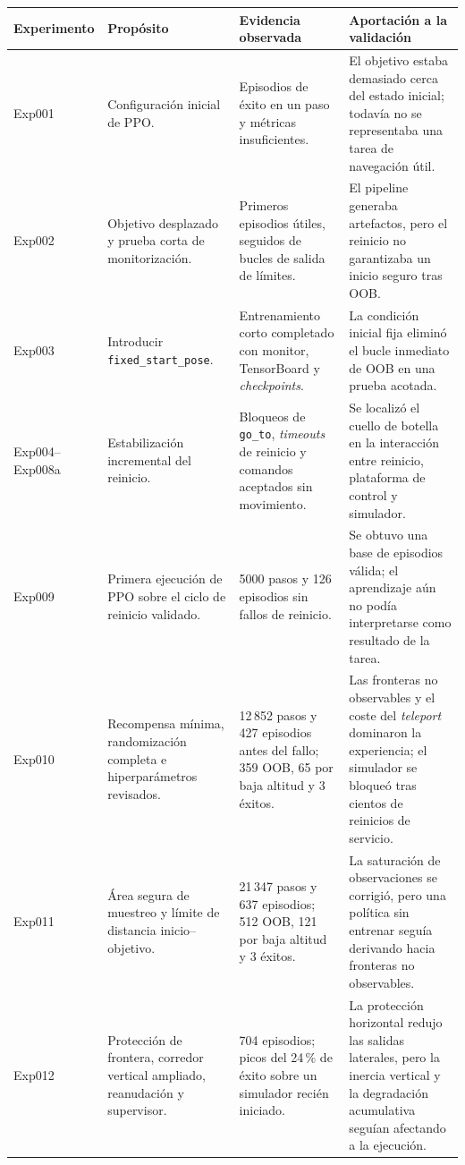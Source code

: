 \begin{table}[H]
\centering
\scriptsize
\setlength{\tabcolsep}{2.5pt}
\renewcommand{\arraystretch}{1.12}
\begin{tabular}{p{} p{} p{} p{}}
\hline
\textbf{Experimento} & \textbf{Propósito} & \textbf{Evidencia observada} & \textbf{Aportación a la validación} \\
\hline
Exp001 & Configuración inicial de PPO. & Episodios de éxito en un paso y métricas insuficientes. & El objetivo estaba demasiado cerca del estado inicial; todavía no se representaba una tarea de navegación útil. \\
Exp002 & Objetivo desplazado y prueba corta de monitorización. & Primeros episodios útiles, seguidos de bucles de salida de límites. & El pipeline generaba artefactos, pero el reinicio no garantizaba un inicio seguro tras OOB\footnotemark. \\
Exp003 & Introducir \texttt{fixed\_start\_pose}. & Entrenamiento corto completado con monitor, TensorBoard y \emph{checkpoints}. & La condición inicial fija eliminó el bucle inmediato de OOB en una prueba acotada. \\
Exp004--Exp008a & Estabilización incremental del reinicio. & Bloqueos de \texttt{go\_to}, \emph{timeouts} de reinicio y comandos aceptados sin movimiento. & Se localizó el cuello de botella en la interacción entre reinicio, plataforma de control y simulador. \\
Exp009 & Primera ejecución de PPO sobre el ciclo de reinicio validado. & 5000 pasos y 126 episodios sin fallos de reinicio. & Se obtuvo una base de episodios válida; el aprendizaje aún no podía interpretarse como resultado de la tarea. \\
Exp010 & Recompensa mínima, randomización completa e hiperparámetros revisados. & 12\,852 pasos y 427 episodios antes del fallo; 359 OOB, 65 por baja altitud y 3 éxitos. & Las fronteras no observables y el coste del \emph{teleport} dominaron la experiencia; el simulador se bloqueó tras cientos de reinicios de servicio. \\
Exp011 & Área segura de muestreo y límite de distancia inicio--objetivo. & 21\,347 pasos y 637 episodios; 512 OOB, 121 por baja altitud y 3 éxitos. & La saturación de observaciones se corrigió, pero una política sin entrenar seguía derivando hacia fronteras no observables. \\
Exp012 & Protección de frontera, corredor vertical ampliado, reanudación y supervisor. & 704 episodios; picos del 24\,\% de éxito sobre un simulador recién iniciado. & La protección horizontal redujo las salidas laterales, pero la inercia vertical y la degradación acumulativa seguían afectando a la ejecución. \\

\end{tabular}
\end{table}
